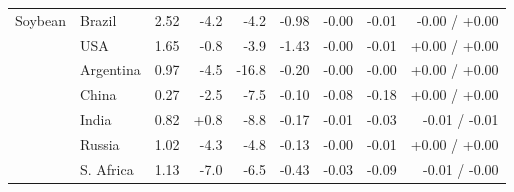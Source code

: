 \begin{tabular}{llrrrrrrr}
\midrule
Soybean & Brazil & 2.52 & -4.2 & -4.2 & -0.98 & -0.00 & -0.01 & -0.00 / +0.00\\
 & USA & 1.65 & -0.8 & -3.9 & -1.43 & -0.00 & -0.01 & +0.00 / +0.00\\
 & Argentina & 0.97 & -4.5 & -16.8 & -0.20 & -0.00 & -0.00 & +0.00 / +0.00\\
 & China & 0.27 & -2.5 & -7.5 & -0.10 & -0.08 & -0.18 & +0.00 / +0.00\\
 & India & 0.82 & +0.8 & -8.8 & -0.17 & -0.01 & -0.03 & -0.01 / -0.01\\
 & Russia & 1.02 & -4.3 & -4.8 & -0.13 & -0.00 & -0.01 & +0.00 / +0.00\\
 & S. Africa & 1.13 & -7.0 & -6.5 & -0.43 & -0.03 & -0.09 & -0.01 / -0.00\\
\bottomrule
\end{tabular}
